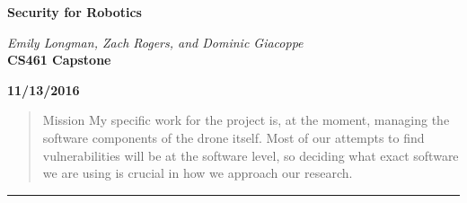 \documentclass[IEEEtran,letterpaper,10pt,titlepage,draftclsnofoot,onecolumn]{article}
\begin{document}
\begin{titlepage}
  \begin{center}
    \vspace*{1cm}
    
    \huge
    \textbf{Security for Robotics}      
  \vspace{0.5cm}
        
    \textit{Emily Longman, Zach Rogers, and Dominic Giacoppe}\\ 
  \vspace{0.5cm}
    \vfill
    \large
    \textbf{CS461 Capstone}\\ 
  \vspace{5mm}

    \textbf{11/13/2016}\\ 
    
    \vfill
    \end{center}
\end{titlepage}

\begin{abstract}
Mission
My specific work for the project is, at the moment, managing the software components of the drone itself. 
Most of our attempts to find vulnerabilities will be at the software level, so deciding what exact software we are using is crucial in how we approach our research.
\end{abstract}

\hrule\vspace{5mm}
\end{document}
